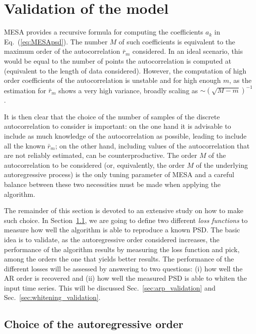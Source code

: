 \documentclass[epj,nopacs]{svjour}
\begin{document}
\section{Validation of the model}\label{sec:validation}

MESA provides a recursive formula for computing the coefficients $a_k$ in Eq.~(\ref{eq:MESApsd}). The number $M$ of such coefficients is equivalent to the maximum order of the autocorrelation $\bar{r}_m$ considered. In an ideal scenario, this would be equal to the number of points the autocorrelation is computed at (equivalent to the length of data considered). However, the computation of high order coefficients of the autocorrelation is unstable and for high enough $m$, as the estimation for  $\bar{r}_m$ shows a very high variance, broadly scaling as $\sim \left(\sqrt{M - m}\right)^{-1}$.

It is then clear that the choice of the number of samples of the discrete autocorrelation to consider is important: 
on the one hand it is advisable to include as much knowledge of the autocorrelation as possible, leading to include all the known $\bar{r}_m$; on the other hand, including values of the autocorrelation that are not reliably estimated, can be counterproductive.
The order $M$ of the autocorrelation to be considered (or, equivalently, the order $M$ of the underlying autoregressive process) is the only tuning parameter of MESA and a careful balance between these two necessities must be made when applying the algorithm.

The remainder of this section is devoted to an extensive study on how to make such choice.
In Section~\ref{sec:optimizers}, we are going to define two different \textit{loss functions} to measure how well the 
algorithm is able to reproduce a known PSD.
The basic idea is to validate, as the autoregressive order considered increases, the performance of the algorithm results 
by measuring the loss function and pick, among the orders the one that yields better results.
The performance of the different losses will be assessed by answering to two questions: (i) how well the AR order is recovered and (ii) how well the measured PSD is able to whiten the input time series.
This will be discussed Sec.~\ref{sec:arp_validation} and Sec.~\ref{sec:whitening_validation}.

\subsection{Choice of the autoregressive order}\label{sec:optimizers} 
\end{document}
